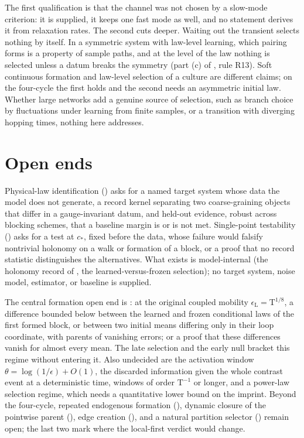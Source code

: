 The first qualification is that the channel was not chosen by a slow-mode criterion: it is supplied, it
keeps one fast mode as well, and no statement derives it from relaxation rates. The second cuts deeper.
Waiting out the transient selects nothing by itself. In a symmetric system with law-level learning, which
pairing forms is a property of sample paths, and at the level of the law nothing is selected unless a
datum breaks the symmetry (part (c) of , rule R13). Soft
continuous formation and law-level selection of a culture are different claims; on the four-cycle the
first holds and the second needs an asymmetric initial law. Whether large networks add a genuine source
of selection, such as branch choice by fluctuations under learning from finite samples, or a transition
with diverging hopping times, nothing here addresses.

\section{Open ends}
\label{comp:ch14-open}

Physical-law identification () asks for a named target system whose
data the model does not generate, a record kernel separating two coarse-graining objects that differ in a
gauge-invariant datum, and held-out evidence, robust across blocking schemes, that a baseline margin is or
is not met. Single-point testability () asks for a test at $c_*$, fixed before
the data, whose failure would falsify nontrivial holonomy on a walk or formation of a block, or a proof
that no record statistic distinguishes the alternatives. What exists is model-internal (the holonomy
record of , the learned-versus-frozen selection); no target system,
noise model, estimator, or baseline is supplied.

The central formation open end is : at the original coupled mobility
$\epsilon_{\mathrm L}=\mathrm T^{1/8}$, a difference bounded below between the learned and frozen
conditional laws of the first formed block, or between two initial means differing only in their loop
coordinate, with parents of vanishing errors; or a proof that these differences vanish for almost every
mean. The late selection and the early null bracket this regime without entering it. Also undecided are
the activation window $\theta=\log(1/\epsilon)+O(1)$, the discarded information given the whole contrast
event at a deterministic time, windows of order $\mathrm T^{-1}$ or longer, and a power-law selection
regime, which needs a quantitative lower bound on the imprint. Beyond the four-cycle, repeated endogenous
formation (), dynamic closure of the pointwise parent
(), edge creation (), and a natural
partition selector () remain open; the last two mark where the local-first
verdict would change.

